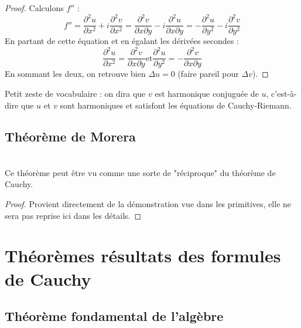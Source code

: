 	\begin{proof}
	Calculons $f''$ :
	\begin{equation}
	f'' = \frac{\partial^2 u}{\partial x^2} + i\frac{\partial^2 v}{\partial x^2} = \frac{\partial^2 v
	}{\partial x\partial y} -i\frac{\partial^2 u}{\partial x \partial y} = -\frac{\partial^2 u}{
	\partial y^2} - i\frac{\partial^2v}{\partial y^2}
	\end{equation}
	En partant de cette équation et en égalant les dérivées secondes :
	\begin{equation}
	\frac{\partial^2u}{\partial x^2} = \frac{\partial^2 v}{\partial x \partial y} \text{et} \frac{
	\partial^2u}{\partial y^2} = -\frac{\partial^2 v}{\partial x \partial y}
	\end{equation}
	En sommant les deux, on retrouve bien $\Delta u = 0$ (faire pareil pour $\Delta v$).
	\end{proof}
	Petit zeste de vocabulaire : on dira que $v$ est  harmonique conjuguée de $u$, c'est-à-dire que
	$u$ et $v$ sont harmoniques et satisfont les équations de Cauchy-Riemann.
	
	
	\subsection{Théorème de Morera}
	\ \\
	Ce théorème peut être vu comme une sorte de "réciproque" du théorème de Cauchy.
	\begin{proof}
	Provient directement de la démonstration vue dans les primitives, elle ne sera pas reprise ici
	dans les détails.
	\end{proof}
		
\section{Théorèmes résultats des formules de Cauchy}
	\subsection{Théorème fondamental de l'algèbre}
	\ \\
	
